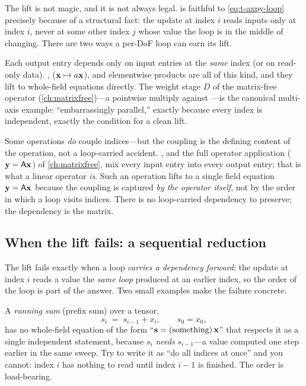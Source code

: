The lift is not magic, and it is not always legal.  is
faithful to \cref{eq:t-axpy-loop} precisely because of a structural fact: the
update at index $i$ reads inputs only at index $i$, never at some other index $j$
whose value the loop is in the middle of changing. There are two ways a per-DoF
loop can earn its lift.

\begin{description}[leftmargin=1.4em, style=nextline]
\item[Per-DoF independence.] Each output entry depends only on input entries at
the \emph{same} index (or on read-only data). ,  ($\mathbf{x}
\mapsto a\mathbf{x}$), and elementwise products are all of this kind, and they lift to
whole-field equations directly. The weight stage $D$ of the matrix-free operator
(\cref{ch:matrixfree})---a pointwise multiply against ---is the
canonical multi-axis example: ``embarrassingly parallel,'' exactly because every
index is independent, exactly the condition for a clean lift.
\item[The coupling \emph{is} the operator.] Some operations \emph{do} couple
indices---but the coupling is the defining content of the operation, not a
loop-carried accident. , and the full operator application
 ($\mathbf{y} = \mathsf{A}\mathbf{x}$) of \cref{ch:matrixfree}, mix every input
entry into every output entry; that is what a linear operator \emph{is}. Such an
operation lifts to a single field equation $\mathbf{y} = \mathsf{A}\mathbf{x}$ because the coupling
is captured \emph{by the operator itself}, not by the order in which a loop visits
indices. There is no loop-carried dependency to preserve; the dependency is the
matrix.
\end{description}

\subsection{When the lift fails: a sequential reduction}
\label{sec:t-lift-fails}

The lift fails exactly when a loop \emph{carries a dependency forward}: the update
at index $i$ reads a value the \emph{same loop} produced at an earlier index, so
the order of the loop is part of the answer. Two small examples make the failure
concrete.

A \emph{running sum} (prefix sum) over a tensor,
\begin{equation}
  s_i \;=\; s_{i-1} + x_i, \qquad s_0 = x_0,
  \label{eq:t-prefix}
\end{equation}
has no whole-field equation of the form ``$\mathbf{s} = (\text{something})\,\mathbf{x}$'' that
respects it as a single independent statement, because $s_i$ \emph{needs}
$s_{i-1}$---a value computed one step earlier in the same sweep. Try to write it
as ``do all indices at once'' and you cannot: index $i$ has nothing to read until
index $i-1$ is finished. The order is load-bearing.

